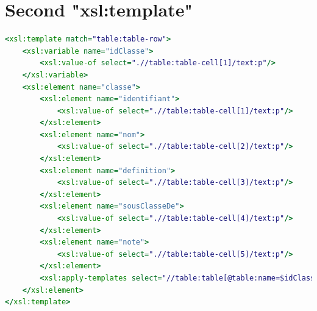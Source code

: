 \documentclass[11pt]{report}
\begin{document}
\section{Second "xsl:template"}
\begin{lstlisting}[language=XSLT]
<xsl:template match="table:table-row">
    <xsl:variable name="idClasse">
        <xsl:value-of select=".//table:table-cell[1]/text:p"/>
    </xsl:variable>
    <xsl:element name="classe">
        <xsl:element name="identifiant">
            <xsl:value-of select=".//table:table-cell[1]/text:p"/>
        </xsl:element>
        <xsl:element name="nom">
            <xsl:value-of select=".//table:table-cell[2]/text:p"/>
        </xsl:element>
        <xsl:element name="definition">
            <xsl:value-of select=".//table:table-cell[3]/text:p"/>
        </xsl:element>
        <xsl:element name="sousClasseDe">
            <xsl:value-of select=".//table:table-cell[4]/text:p"/>
        </xsl:element>
        <xsl:element name="note">
            <xsl:value-of select=".//table:table-cell[5]/text:p"/>
        </xsl:element>
        <xsl:apply-templates select="//table:table[@table:name=$idClasse]"/>
    </xsl:element>
</xsl:template>
\end{lstlisting}
\end{document}
